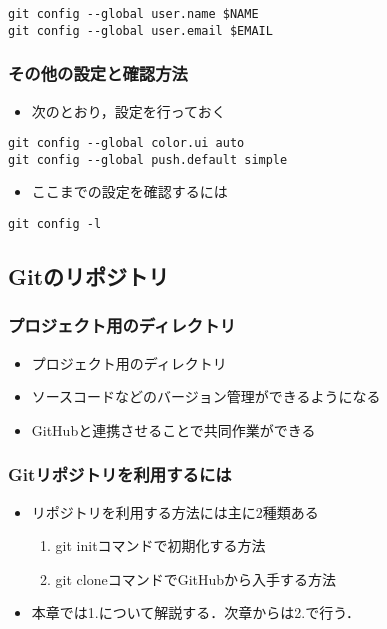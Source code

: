 \documentclass[a4paper,twoside,twocolumn]{bxjsarticle}
\begin{document}
\begin{verbatim}
git config --global user.name $NAME
git config --global user.email $EMAIL
\end{verbatim}

\subsubsection{その他の設定と確認方法}
\label{sec-1-1-3}
\begin{itemize}
\item 次のとおり，設定を行っておく
\end{itemize}

\begin{verbatim}
git config --global color.ui auto
git config --global push.default simple
\end{verbatim}

\begin{itemize}
\item ここまでの設定を確認するには
\end{itemize}

\begin{verbatim}
git config -l
\end{verbatim}
\subsection{Gitのリポジトリ}
\label{sec-1-2}
\subsubsection{プロジェクト用のディレクトリ}
\label{sec-1-2-1}
\begin{itemize}
\item プロジェクト用のディレクトリ
\item ソースコードなどのバージョン管理ができるようになる
\item GitHubと連携させることで共同作業ができる
\end{itemize}

\subsubsection{Gitリポジトリを利用するには}
\label{sec-1-2-2}
\begin{itemize}
\item リポジトリを利用する方法には主に2種類ある
\begin{enumerate}
\item git initコマンドで初期化する方法
\item git cloneコマンドでGitHubから入手する方法
\end{enumerate}
\item 本章では1.について解説する．次章からは2.で行う．
\end{itemize}
\end{document}
